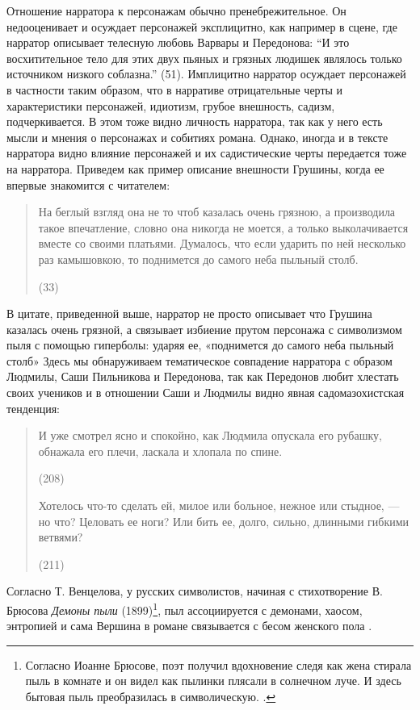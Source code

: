\documentclass[12pt,a4paper]{article}
\begin{document}
Отношение нарратора к персонажам обычно пренебрежительное. Он недооценивает и осуждает персонажей эксплицитно, как например в сцене, где нарратор описывает телесную любовь Варвары и Передонова: 
\enquote{И это восхитительное тело для этих двух пьяных и грязных людишек являлось только источником низкого соблазна.} (51). 
Имплицитно нарратор осуждает персонажей в частности таким образом, что в нарративе отрицательные черты и характеристики персонажей, идиотизм, грубое внешность, садизм, подчеркивается. В этом тоже видно личность нарратора, так как у него есть мысли и мнения о персонажах и собитиях романа. Однако, иногда и в тексте нарратора видно влияние персонажей и их садистические черты передается тоже на нарратора. Приведем как пример описание внешности Грушины, когда ее впервые знакомится с читателем:

\begin{quote}
На беглый взгляд она не то
чтоб казалась очень грязною, а производила такое впечатление, словно
она никогда не моется, а только выколачивается вместе со своими 
платьями. Думалось, что если ударить по ней несколько раз камышовкою,
то поднимется до самого неба пыльный столб.

(33)
\end{quote}

В цитате, приведенной выше, нарратор не просто описывает что Грушина казалась очень грязной, а  связывает избиение прутом персонажа с символизмом пыля с помощью гиперболы: ударяя ее, «поднимется до самого неба пыльный столб» Здесь мы обнаруживаем тематическое совпадение нарратора с образом Людмилы, Саши Пильникова и Передонова, так как Передонов любит хлестать своих учеников и в отношении Саши и Людмилы видно явная садомазохистская тенденция:
\begin{quote}
И уже смотрел ясно и спокойно, как Людмила опускала его рубашку, обнажала его плечи, ласкала и хлопала по спине.

(208)

Хотелось что-то сделать ей, милое или больное, нежное или
стыдное, — но что? Целовать ее ноги? Или бить ее, долго, сильно, длинными гибкими ветвями?

(211) 
\end{quote}

Согласно Т. Венцелова, у русских символистов, начиная с стихотворение В. Брюсова \emph{Демоны пыли} (1899)\footnote{ Согласно Иоанне Брюсове, поэт получил вдохновение следя как жена стирала пыль в комнате и он видел как пылинки плясали в солнечном луче. И здесь бытовая пыль преобразилась в символическую. \parencite[600]{brjusov1973}.}, пыл ассоциируется с демонами, хаосом, энтропией и сама Вершина в романе связывается с бесом женского пола \parencite[42--44]{venclova2012}. 
\end{document}

